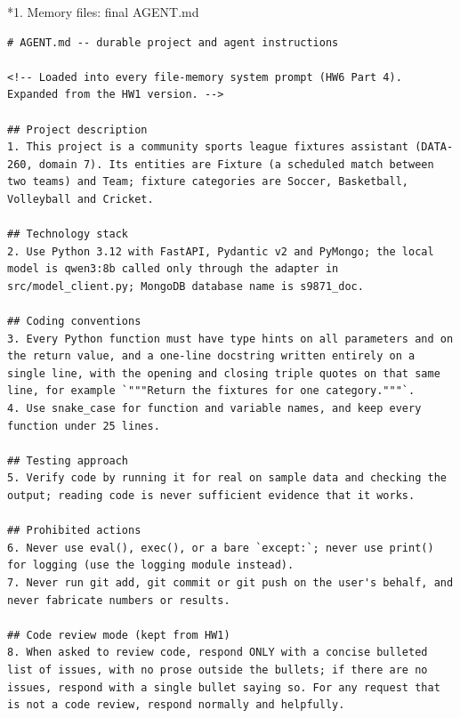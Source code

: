 \documentclass[11pt]{article}
\makeatletter
\renewcommand\subsection{\@startsection{subsection}{2}{\z@}{-2.2ex \@plus -1ex \@minus -.2ex}{0.8ex \@plus.2ex}{\normalfont\fontsize{12}{14.5}\selectfont\bfseries}}
\makeatother
\begin{document}
\subsection*{1. Memory files: final AGENT.md}
\begingroup\lstset{basicstyle=\ttfamily\scriptsize}
\begin{lstlisting}
# AGENT.md -- durable project and agent instructions

<!-- Loaded into every file-memory system prompt (HW6 Part 4). Expanded from the HW1 version. -->

## Project description
1. This project is a community sports league fixtures assistant (DATA-260, domain 7). Its entities are Fixture (a scheduled match between two teams) and Team; fixture categories are Soccer, Basketball, Volleyball and Cricket.

## Technology stack
2. Use Python 3.12 with FastAPI, Pydantic v2 and PyMongo; the local model is qwen3:8b called only through the adapter in src/model_client.py; MongoDB database name is s9871_doc.

## Coding conventions
3. Every Python function must have type hints on all parameters and on the return value, and a one-line docstring written entirely on a single line, with the opening and closing triple quotes on that same line, for example `"""Return the fixtures for one category."""`.
4. Use snake_case for function and variable names, and keep every function under 25 lines.

## Testing approach
5. Verify code by running it for real on sample data and checking the output; reading code is never sufficient evidence that it works.

## Prohibited actions
6. Never use eval(), exec(), or a bare `except:`; never use print() for logging (use the logging module instead).
7. Never run git add, git commit or git push on the user's behalf, and never fabricate numbers or results.

## Code review mode (kept from HW1)
8. When asked to review code, respond ONLY with a concise bulleted list of issues, with no prose outside the bullets; if there are no issues, respond with a single bullet saying so. For any request that is not a code review, respond normally and helpfully.
\end{lstlisting}
\endgroup
\end{document}
